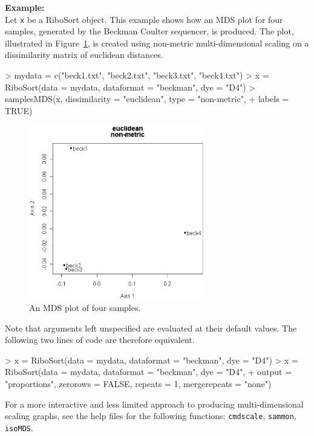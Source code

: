 \documentclass[a4paper]{article}
\begin{document}
%
\vspace{3mm}
\textbf{Example:}\\
Let \texttt{x} be a RiboSort object. This example shows how an MDS plot for four samples, generated by the Beckman Coulter sequencer, is produced. The plot, illustrated in Figure~\ref{fig:beck14}, is created using non-metric multi-dimensional scaling on a dissimilarity matrix of euclidean distances.

\begin{Schunk}
\begin{Sinput}
> mydata = c("beck1.txt", "beck2.txt", "beck3.txt", "beck4.txt")
> x = RiboSort(data = mydata, dataformat = "beckman", dye = "D4")
> samplesMDS(x, dissimilarity = "euclidean", type = "non-metric", 
+     labels = TRUE)
\end{Sinput}
\end{Schunk}
\begin{figure}
\centering
\includegraphics[height=3in]{EPS/beck14mdsplot.eps}
\caption{An MDS plot of four samples.}
\label{fig:beck14}
\end{figure}

Note that arguments left unspecified are evaluated at their default values. The following two lines of code are therefore equivalent.

\begin{Schunk}
\begin{Sinput}
> x = RiboSort(data = mydata, dataformat = "beckman", dye = "D4")
> x = RiboSort(data = mydata, dataformat = "beckman", dye = "D4", 
+     output = "proportions", zerorows = FALSE, repeats = 1, mergerepeats = "none")
\end{Sinput}
\end{Schunk}
For a more interactive and less limited approach to producing multi-dimensional scaling graphs, see the help files for the following functions: \texttt{cmdscale}, \texttt{sammon}, \texttt{isoMDS}.
\end{document}
